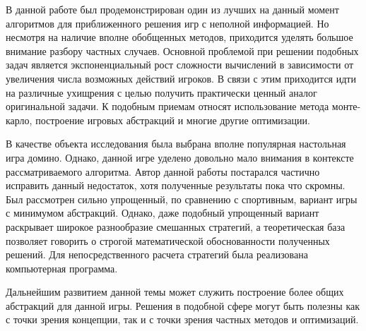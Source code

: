 \Conclusion %
\par
В данной работе был продемонстрирован один из лучших на данный момент алгоритмов для приближенного решения игр с неполной информацией. Но несмотря на наличие вполне обобщенных методов, приходится уделять большое внимание разбору частных случаев. Основной проблемой при решении подобных задач является экспоненциальный рост сложности вычислений в зависимости от увеличения числа возможных действий игроков. В связи с этим приходится идти на различные ухищрения с целью получить практически ценный аналог оригинальной задачи. К подобным приемам относят использование метода монте-карло, построение игровых абстракций и многие другие оптимизации.
\par
В качестве объекта исследования была выбрана вполне популярная настольная игра домино. Однако, данной игре уделено довольно мало внимания в контексте рассматриваемого алгоритма. Автор данной работы постарался частично исправить данный недостаток, хотя полученные результаты пока что скромны. Был рассмотрен сильно упрощенный, по сравнению с спортивным, вариант игры с минимумом абстракций. Однако, даже подобный упрощенный вариант раскрывает широкое разнообразие смешанных стратегий, а теоретическая база позволяет говорить о строгой математической обоснованности полученных решений. Для непосредственного расчета стратегий была реализована компьютерная программа.
\par
Дальнейшим развитием данной темы может служить построение более общих абстракций для данной игры. Решения в подобной сфере могут быть полезны как с точки зрения концепции, так и с точки зрения частных методов и оптимизаций.